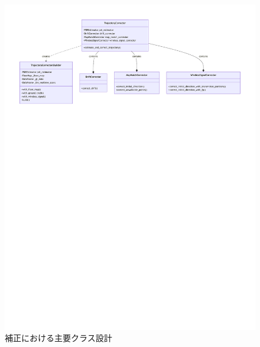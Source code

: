\begin{figure}[H]
    \centering
    \includegraphics[width=\linewidth]{../image/corrector-class-diagram.pdf}
    \caption{補正における主要クラス設計}
    \label{fig:corrector-class}
\end{figure}

